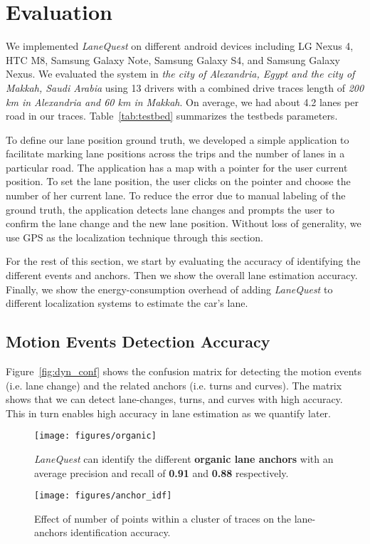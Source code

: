 \documentclass[10pt, conference, compsocconf]{IEEEtran}
\def \sys {\textit{LaneQuest}}
\newcommand{\figscale}{0.7}
\begin{document}
\section{Evaluation}\label{sec:eval}

We implemented \sys{} on different android devices including LG Nexus 4, HTC M8, Samsung Galaxy Note, Samsung Galaxy S4, and Samsung Galaxy Nexus. We evaluated the system in \emph{the city of Alexandria, Egypt and the city of Makkah, Saudi Arabia} using 13 drivers with a combined drive traces length of \emph{200 km in Alexandria and 60 km in Makkah}. On average, we had about 4.2 lanes per road in our traces. Table~\ref{tab:testbed} summarizes the testbeds parameters.

To define our lane position ground truth, we developed a simple application to facilitate marking lane positions across the trips and the number of lanes in a particular road. The application has a map with a pointer for the user current position. To set the lane position, the user clicks on the pointer and choose the number of her current lane. To reduce the error due to manual labeling of the ground truth, the application detects lane changes and prompts the user to confirm the lane change and the new lane position. Without loss of generality, we use GPS as the localization technique through this section.

For the rest of this section, we start by evaluating the accuracy of identifying the different events and anchors. Then we show the overall lane estimation accuracy. Finally, we show the energy-consumption overhead of adding \sys{} to different localization systems to estimate the car's lane.

\subsection{Motion Events Detection Accuracy}
Figure~\ref{fig:dyn_conf} shows the confusion matrix for detecting the motion events (i.e. lane change) and the related anchors (i.e. turns and curves). The matrix shows that we can detect lane-changes, turns, and curves with high accuracy. This in turn enables high accuracy in lane estimation as we quantify later.
\begin{figure}[!t]
\centering
\texttt{[image: figures/organic]}
\caption{\sys{} can identify the different \textbf{organic lane anchors} with an average precision and recall of \textbf{0.91} and \textbf{0.88} respectively.}
\label{fig:anchor_det_org}
\end{figure}
\begin{figure}[!t]
\centering
\texttt{[image: figures/anchor\_idf]}
\caption{Effect of number of points within a cluster of traces on the lane-anchors identification accuracy.}
\label{fig:bump_idf}
\end{figure}
\end{document}
